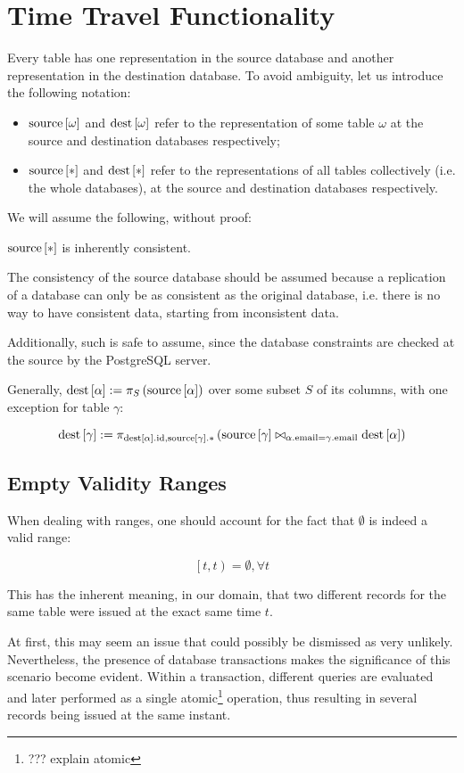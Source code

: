 \chapter{Time Travel Functionality}
\label{ch:timetravel}

Every table has one representation in the source database and another representation in the destination database.
To avoid ambiguity, let us introduce the following notation:

\begin{itemize}
\item $\text{source}\left[{\omega}\right]$ and $\text{dest}\left[{\omega}\right]$ refer to the representation of some table $\omega$ at the source and destination databases respectively;
\item $\text{source}\left[{*}\right]$ and $\text{dest}\left[{*}\right]$ refer to the representations of all tables collectively (i.e. the whole databases), at the source and destination databases respectively.
\end{itemize}


We will assume the following, without proof:

\begin{axiom}
$\text{source}\left[{*}\right]$ is inherently consistent.
\end{axiom}

The consistency of the source database should be assumed because a replication of a database can only be as consistent as the original database, i.e. there is no way to have consistent data, starting from inconsistent data.

Additionally, such is safe to assume, since the database constraints are checked at the source by the PostgreSQL server.

Generally, 
$\text{dest}\left[{\alpha}\right] := \pi_{S}\left(\text{source}\left[{\alpha}\right]\right)$
over some subset $S$ of its columns,
with one exception for table $\gamma$:

$$
\text{dest}\left[{\gamma}\right] := \pi_{\text{dest}\left[{\alpha}\right].\text{id}, \text{source}\left[{\gamma}\right].*}
    \left(
        \text{source}\left[{\gamma}\right] \bowtie_{\alpha.\text{email} = \gamma.\text{email}} \text{dest}\left[{\alpha}\right]
    \right)
$$

\section{Empty Validity Ranges}

When dealing with ranges, one should account for the fact that $\emptyset$ is indeed a valid range:

$$
\left[t, t\right) = \emptyset, \forall t
$$

This has the inherent meaning, in our domain, that two different records for the same table were issued at the exact same time $t$.

At first, this may seem an issue that could possibly be dismissed as very unlikely.
Nevertheless, the presence of database transactions makes the significance of this scenario become evident.
Within a transaction, different queries are evaluated and later performed as a single atomic\footnote{??? explain atomic} operation, thus resulting in several records being issued at the same instant.

